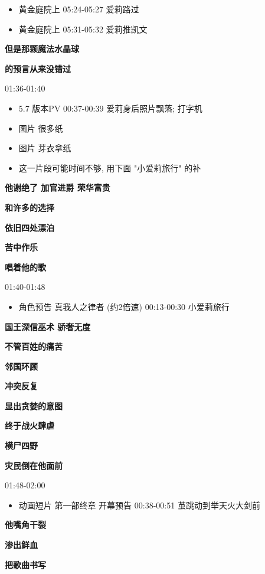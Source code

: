 \documentclass[a4paper]{article}
\begin{document}
\begin{itemize}
    \item 黄金庭院上 05:24-05:27 爱莉路过
    \item 黄金庭院上 05:31-05:32 爱莉推凯文
\end{itemize}

\textbf{但是那颗魔法水晶球}

\textbf{的预言从来没错过}

01:36-01:40

\begin{itemize}
    \item 5.7 版本PV 00:37-00:39 爱莉身后照片飘落; 打字机
    \item 图片 很多纸
    \item 图片 芽衣拿纸
    \item 这一片段可能时间不够, 用下面 "小爱莉旅行" 的补
\end{itemize}

\textbf{他谢绝了 加官进爵 荣华富贵}

\textbf{和许多的选择}

\textbf{依旧四处漂泊}

\textbf{苦中作乐}

\textbf{唱着他的歌}

01:40-01:48

\begin{itemize}
    \item 角色预告 真我人之律者 (约2倍速) 00:13-00:30 小爱莉旅行
\end{itemize}

\textbf{国王深信巫术 骄奢无度}

\textbf{不管百姓的痛苦}

\textbf{邻国环顾}

\textbf{冲突反复}

\textbf{显出贪婪的意图}

\textbf{终于战火肆虐}

\textbf{横尸四野}

\textbf{灾民倒在他面前}

01:48-02:00

\begin{itemize}
    \item 动画短片 第一部终章 开幕预告 00:38-00:51 茧跳动到举天火大剑前
\end{itemize}

\textbf{他嘴角干裂}

\textbf{渗出鲜血}

\textbf{把歌曲书写}
\end{document}
